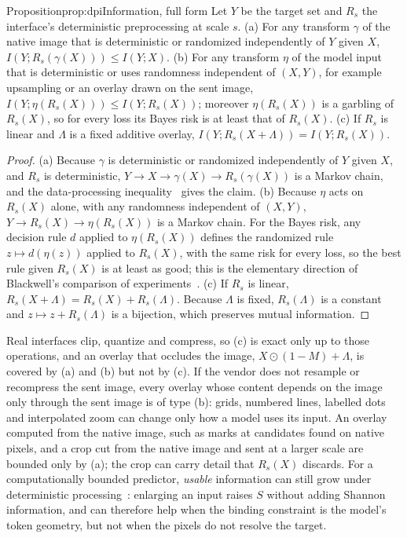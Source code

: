 \begin{restate}{Proposition}{prop:dpi}{Information, full form}
Let $Y$ be the target set and $R_s$ the interface's deterministic preprocessing at scale $s$. (a) For any transform $\gamma$ of the native image that is deterministic or randomized independently of $Y$ given $X$, $I(Y; R_s(\gamma(X))) \le I(Y; X)$. (b) For any transform $\eta$ of the model input that is deterministic or uses randomness independent of $(X, Y)$, for example upsampling or an overlay drawn on the sent image, $I(Y; \eta(R_s(X))) \le I(Y; R_s(X))$; moreover $\eta(R_s(X))$ is a garbling of $R_s(X)$, so for every loss its Bayes risk is at least that of $R_s(X)$. (c) If $R_s$ is linear and $\Lambda$ is a fixed additive overlay, $I(Y; R_s(X + \Lambda)) = I(Y; R_s(X))$.
\end{restate}

\begin{proof}
(a) Because $\gamma$ is deterministic or randomized independently of $Y$ given $X$, and $R_s$ is deterministic, $Y \to X \to \gamma(X) \to R_s(\gamma(X))$ is a Markov chain, and the data-processing inequality~\cite{cover2006elements} gives the claim. (b) Because $\eta$ acts on $R_s(X)$ alone, with any randomness independent of $(X,Y)$, $Y \to R_s(X) \to \eta(R_s(X))$ is a Markov chain. For the Bayes risk, any decision rule $d$ applied to $\eta(R_s(X))$ defines the randomized rule $z \mapsto d(\eta(z))$ applied to $R_s(X)$, with the same risk for every loss, so the best rule given $R_s(X)$ is at least as good; this is the elementary direction of Blackwell's comparison of experiments~\cite{blackwell1953equivalent}. (c) If $R_s$ is linear, $R_s(X+\Lambda) = R_s(X) + R_s(\Lambda)$. Because $\Lambda$ is fixed, $R_s(\Lambda)$ is a constant and $z \mapsto z + R_s(\Lambda)$ is a bijection, which preserves mutual information.
\end{proof}

Real interfaces clip, quantize and compress, so (c) is exact only up to those operations, and an overlay that occludes the image, $X \odot (1-M) + \Lambda$, is covered by (a) and (b) but not by (c). If the vendor does not resample or recompress the sent image, every overlay whose content depends on the image only through the sent image is of type (b): grids, numbered lines, labelled dots and interpolated zoom can change only how a model uses its input. An overlay computed from the native image, such as marks at candidates found on native pixels, and a crop cut from the native image and sent at a larger scale are bounded only by (a); the crop can carry detail that $R_s(X)$ discards. For a computationally bounded predictor, \emph{usable} information can still grow under deterministic processing~\cite{xu2020usable}: enlarging an input raises $S$ without adding Shannon information, and can therefore help when the binding constraint is the model's token geometry, but not when the pixels do not resolve the target.

